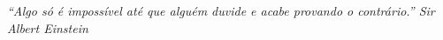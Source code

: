 \begin{titlepage}

\vspace*{\fill}

\hfill
\begin{minipage}{0.5\linewidth}
\begin{flushright}
\large\it
``Algo só é impossível até que alguém duvide e acabe provando o
contrário.''\linebreak
\small
Sir Albert Einstein
\end{flushright}
\end{minipage}

\end{titlepage}
